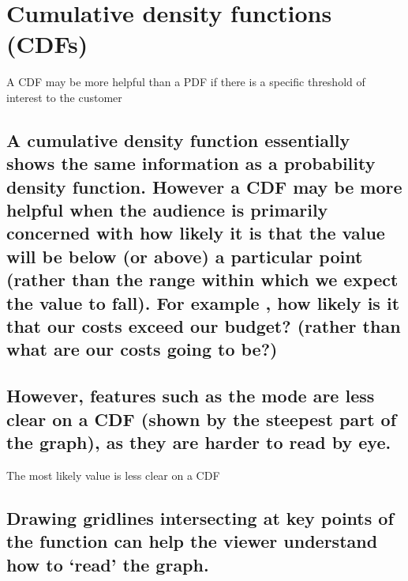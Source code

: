 \documentclass[]{book}
\begin{document}
\section{Cumulative density functions
(CDFs)}\label{cumulative-density-functions-cdfs}

 A CDF may be more helpful than a PDF if there is a specific threshold
of interest to the customer

\subsection{A cumulative density function essentially shows the same
information as a probability density function. However a CDF may be more
helpful when the audience is primarily concerned with how likely it is
that the value will be below (or above) a particular point (rather than
the range within which we expect the value to fall). For example , how
likely is it that our costs exceed our budget? (rather than what are our
costs going to
be?)}\label{a-cumulative-density-function-essentially-shows-the-same-information-as-a-probability-density-function.-however-a-cdf-may-be-more-helpful-when-the-audience-is-primarily-concerned-with-how-likely-it-is-that-the-value-will-be-below-or-above-a-particular-point-rather-than-the-range-within-which-we-expect-the-value-to-fall.-for-example-how-likely-is-it-that-our-costs-exceed-our-budget-rather-than-what-are-our-costs-going-to-be}

\subsection{However, features such as the mode are less clear on a CDF
(shown by the steepest part of the graph), as they are harder to read by
eye.}\label{however-features-such-as-the-mode-are-less-clear-on-a-cdf-shown-by-the-steepest-part-of-the-graph-as-they-are-harder-to-read-by-eye.}

 The most likely value is less clear on a CDF

\subsection{\texorpdfstring{Drawing gridlines intersecting at key points
of the function can help the viewer understand how to `read' the
graph.}{Drawing gridlines intersecting at key points of the function can help the viewer understand how to read the graph.}}\label{drawing-gridlines-intersecting-at-key-points-of-the-function-can-help-the-viewer-understand-how-to-read-the-graph.}
\end{document}
